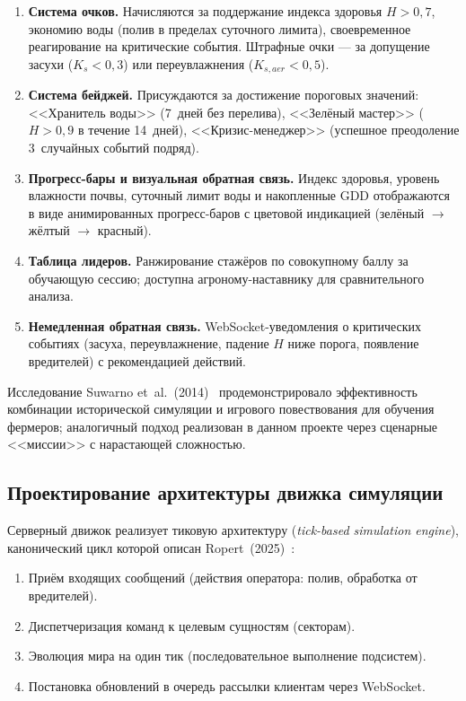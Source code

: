 \begin{enumerate}
	\item \textbf{Система очков.} Начисляются за поддержание
	индекса здоровья $H > 0{,}7$, экономию воды (полив в
	пределах суточного лимита), своевременное реагирование
	на критические события. Штрафные очки --- за допущение
	засухи ($K_s < 0{,}3$) или переувлажнения
	($K_{s,aer} < 0{,}5$).
	\item \textbf{Система бейджей.} Присуждаются за
	достижение пороговых значений: <<Хранитель воды>>
	(7~дней без перелива), <<Зелёный мастер>> ($H > 0{,}9$
	в течение 14~дней), <<Кризис-менеджер>> (успешное
	преодоление 3~случайных событий подряд).
	\item \textbf{Прогресс-бары и визуальная обратная связь.}
	Индекс здоровья, уровень влажности почвы, суточный лимит
	воды и накопленные GDD отображаются в виде анимированных
	прогресс-баров с цветовой индикацией (зелёный $\to$
	жёлтый $\to$ красный).
	\item \textbf{Таблица лидеров.} Ранжирование стажёров
	по совокупному баллу за обучающую сессию; доступна
	агроному-наставнику для сравнительного анализа.
	\item \textbf{Немедленная обратная связь.} WebSocket-уведомления о критических событиях
	(засуха, переувлажнение, падение $H$ ниже порога,
	появление вредителей) с рекомендацией действий.
\end{enumerate}

Исследование Suwarno et~al.~(2014)~\cite{suwarno2014_virtual_farmers}
продемонстрировало эффективность комбинации исторической
симуляции и игрового повествования для обучения фермеров;
аналогичный подход реализован в данном проекте через
сценарные <<миссии>> с нарастающей сложностью.


\subsection{Проектирование архитектуры движка симуляции}

Серверный движок реализует тиковую архитектуру
(\emph{tick-based simulation engine}), канонический цикл
которой описан Ropert~(2025)~\cite{ropert2025_game_tick}:

\begin{enumerate}
	\item Приём входящих сообщений (действия оператора: полив, обработка от вредителей).
	\item Диспетчеризация команд к целевым сущностям (секторам).
	\item Эволюция мира на один тик (последовательное выполнение подсистем).
	\item Постановка обновлений в очередь рассылки клиентам через WebSocket.
\end{enumerate}

